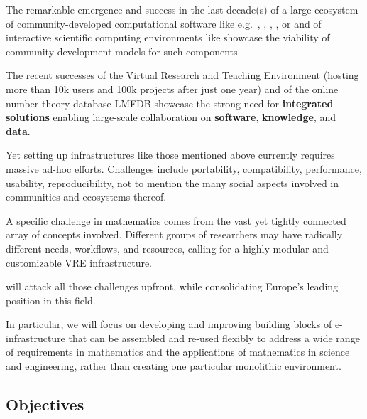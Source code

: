 \documentclass[noworkareas,deliverables,keys]{euproposal}                  %
\begin{document}
\begin{proposal}
The remarkable emergence and success in the last decade(s) of a large
ecosystem of community-developed computational software like
e.g.\ \GAP, \Linbox, \PariGP, \Sage, or \Singular and of interactive
scientific computing environments like \IPython showcase the viability
of community development models for such components.

The recent successes of the Virtual Research and Teaching Environment
\SMC (hosting more than 10k users and 100k projects after just
one year) and of the online number theory database LMFDB showcase the
strong need for \textbf{integrated solutions} enabling large-scale
collaboration on \textbf{software}, \textbf{knowledge}, and \textbf{data}.

Yet setting up infrastructures like those mentioned above currently requires
massive ad-hoc efforts. Challenges include portability, compatibility,
performance, usability, reproducibility, not to mention the many
social aspects involved in communities and ecosystems thereof.


A specific challenge in mathematics comes from the vast yet tightly
connected array of concepts involved. Different groups of researchers
may have radically different needs, workflows, and resources, calling
for a highly modular and customizable VRE infrastructure.

\TheProject will attack all those challenges upfront, while
consolidating Europe's leading position in this field.


In particular, we will focus on developing and improving building
blocks of e-infrastructure that can be assembled and re-used flexibly
to address a wide range of requirements in mathematics and the
applications of mathematics in science and engineering, rather than
creating one particular monolithic environment.



\subsection{Objectives}
\label{sect:objectives}


\end{proposal}
\end{document}
